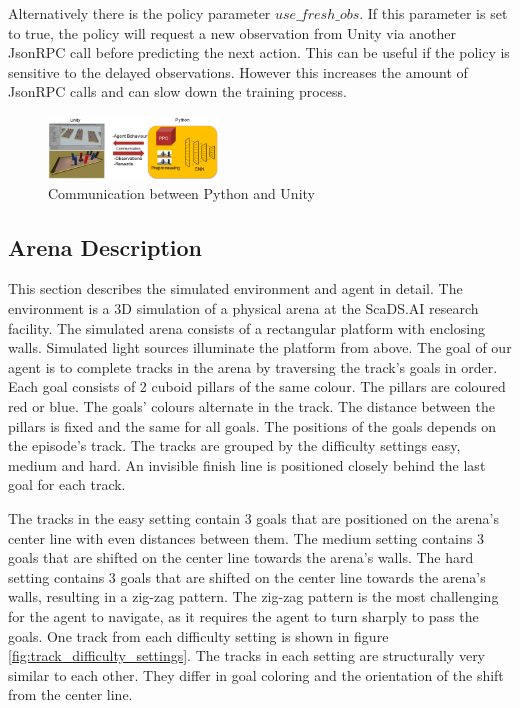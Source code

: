 Alternatively there is the policy parameter $use\_fresh\_obs$. If this parameter is set to true, the policy will request a new observation from Unity via another JsonRPC call before predicting the next action. This can be useful if the policy is sensitive to the delayed observations. However this increases the amount of JsonRPC calls and can slow down the training process.



\begin{figure}
    \centering
    \includegraphics[width=0.4\textwidth]{Bilder/unity_communication.png}
    \caption{Communication between Python and Unity}
    \label{fig:communication_python_unity}
\end{figure} %





\subsection{Arena Description}


This section describes the simulated environment and agent in detail. The environment is a 3D simulation of a physical arena at the ScaDS.AI research facility. The simulated arena consists of a rectangular platform with enclosing walls. Simulated light sources illuminate the platform from above.
The goal of our agent is to complete tracks in the arena by traversing the track's goals in order. Each goal consists of 2 cuboid pillars of the same colour. The pillars are coloured red or blue. The goals' colours alternate in the track. The distance between the pillars is fixed and the same for all goals. The positions of the goals depends on the episode's track. The tracks are grouped by the difficulty settings easy, medium and hard. An invisible finish line is positioned closely behind the last goal for each track.

The tracks in the easy setting contain 3 goals that are positioned on the arena's center line with even distances between them. The medium setting contains 3 goals that are shifted on the center line towards the arena's walls. The hard setting contains 3 goals that are shifted on the center line towards the arena's walls, resulting in a zig-zag pattern. The zig-zag pattern is the most challenging for the agent to navigate, as it requires the agent to turn sharply to pass the goals. One track from each difficulty setting is shown in figure \ref{fig:track_difficulty_settings}. The tracks in each setting are structurally very similar to each other. They differ in goal coloring and the orientation of the shift from the center line.


